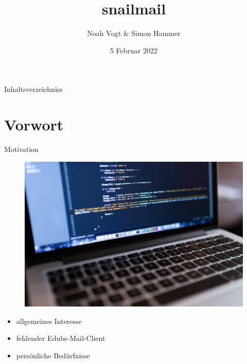 \documentclass[aspectratio=169]{beamer}
\title{snailmail}
\author{Noah Vogt \& Simon Hammer}
\date{5 Februar 2022}
\institute{Gymnasium Kirschgarten}
\newlength\myheight
\newlength\mydepth
\newcommand*\inlinegraphics[1]{
    \settototalheight\myheight{Xygp}
    \settodepth\mydepth{Xygp}
    \raisebox{-\mydepth}{\texttt{[image: \#1]}}%
}
\begin{document}
\maketitle

\begin{frame}{Inhaltsverzeichniss}
    \tableofcontents
\end{frame}


\section{Vorwort}
\begin{frame}{Motivation}
\begin{varwidth}{.5\textwidth}
        \begin{figure}
            \centering
            \includegraphics[width=.9\textwidth]{media/macbook.jpg}
        \end{figure}
    \end{varwidth}
    \hfill
    \begin{varwidth}{.5\textwidth}
        \begin{itemize}\pause
            \item allgemeines Interesse\pause
            \item fehlender Edubs-Mail-Client\pause
            \item persönliche Bedürfnisse
        \end{itemize}
    \end{varwidth} 
\end{frame}
\end{document}
